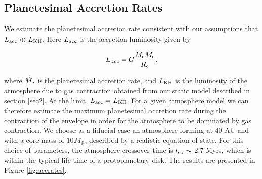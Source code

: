 \documentclass[apj]{emulateapj}
\begin{document}

\subsection{Planetesimal Accretion Rates}
\label{raf1}

We estimate the planetesimal accretion rate consistent with our assumptions that $L_{\mathrm{acc}} \ll L_{\rm{KH}}$. Here $L_{\rm{acc}}$ is the accretion luminosity given by

\begin{equation}
\label{eq:Lacc}
L_{acc}=G \frac{M_{\rm{c}} \dot{M_{\rm{c}}}}{R_{\rm{c}}},
\end{equation}

\noindent where $\dot{M_{\rm{c}}}$ is the planetesimal accretion rate, and $L_{\rm{KH}}$ is the luminosity of the atmosphere due to gas contraction obtained from our static model described in section \ref{sec2}. At the limit, $L_{\rm{acc}}=L_{\rm{KH}}$. For a given atmosphere model we can therefore estimate the maximum planetesimal accretion rate during the contraction of the envelope in order for the atmosphere to be dominated by gas contraction. We choose as a fiducial case an atmosphere forming at 40 AU and with a core mass of $10 M_{\oplus}$, described by a realistic equation of state. For this choice of parameters, the atmosphere crossover time is $t _{\rm{co}}\sim$ 2.7 Myrs, which is within the typical life time of a protoplanetary disk. The results are presented in Figure \ref{fig:accrates}. 
\end{document}
